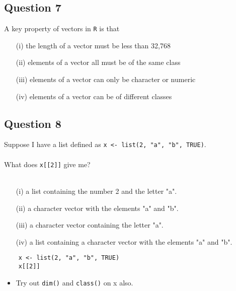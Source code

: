 \documentclass[12pt]{article}
\begin{document}
\newpage
\subsection*{Question 7}
\Large
A key property of vectors in \texttt{R} is that
\begin{itemize}
	\item[(i)] the length of a vector must be less than 32,768
	\item[(ii)] elements of a vector all must be of the same class
	\item[(iii)] elements of a vector can only be character or numeric
	\item[(iv)] elements of a vector can be of different classes
\end{itemize}




\newpage
\subsection*{Question 8}
\Large
Suppose I have a list defined as \texttt{x <- list(2, "a", "b", TRUE)}. \\ \\ What does \texttt{x[[2]]} give me?\\ \\
\begin{itemize}
\item[(i)] a list containing the number 2 and the letter "a".
\item[(ii)] a character vector with the elements "a" and "b".
\item[(iii)] a character vector containing the letter "a".
\item[(iv)] a list containing a character vector with the elements "a" and "b".
\end{itemize}

\begin{framed}
	\begin{verbatim}
	x <- list(2, "a", "b", TRUE)
	x[[2]]
	\end{verbatim}	
\end{framed}

\begin{itemize}
	\item Try out \texttt{dim()} and \texttt{class()} on x also.
	\end{itemize}
\newpage
\end{document}

